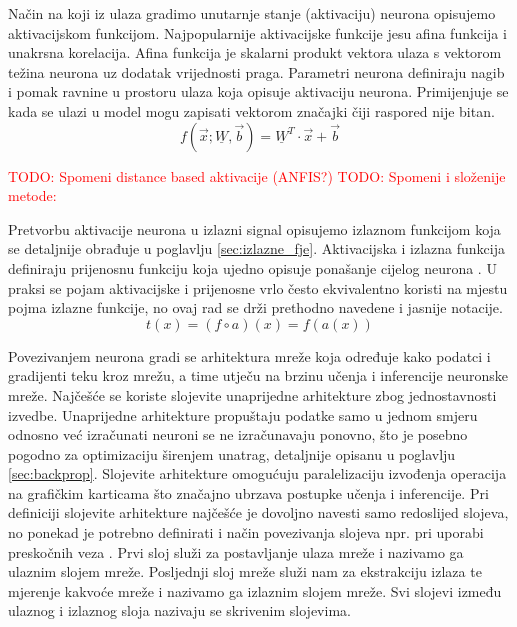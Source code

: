 \documentclass[times, utf8, diplomski]{fer}
\def\mat#1{\underline{#1}}
\def\TODO#1{\noindent\textcolor{red}{TODO: #1}\newline}
\begin{document}
Način na koji iz ulaza gradimo unutarnje stanje (aktivaciju) neurona opisujemo aktivacijskom funkcijom. Najpopularnije aktivacijske funkcije jesu afina funkcija i unakrsna korelacija.
Afina funkcija je skalarni produkt vektora ulaza s vektorom težina neurona uz dodatak vrijednosti praga. Parametri neurona definiraju nagib i pomak ravnine u prostoru ulaza koja opisuje aktivaciju neurona. Primijenjuje se kada se ulazi u model mogu zapisati vektorom značajki čiji raspored nije bitan.
\begin{equation}
f(\vec{x};\mat{W},\vec{b})=\mat{W}^T \cdot \vec{x} + \vec{b}
\end{equation}

\TODO{Spomeni distance based aktivacije (ANFIS?)}
\TODO{Spomeni i složenije metode: \citep{network_in_network}}

Pretvorbu aktivacije neurona u izlazni signal opisujemo izlaznom funkcijom koja se detaljnije obrađuje u poglavlju \ref{sec:izlazne_fje}. Aktivacijska i izlazna funkcija definiraju prijenosnu funkciju koja ujedno opisuje ponašanje cijelog neurona \citep{function_survey}. U praksi se pojam aktivacijske i prijenosne vrlo često ekvivalentno koristi na mjestu pojma izlazne funkcije, no ovaj rad se drži prethodno navedene i jasnije notacije.
\begin{equation}
t(x) = (f \circ a)(x) = f(a(x))
\end{equation}

Povezivanjem neurona gradi se arhitektura mreže koja određuje kako podatci i gradijenti teku kroz mrežu, a time utječu na brzinu učenja i inferencije neuronske mreže. Najčešće se koriste slojevite unaprijedne arhitekture zbog jednostavnosti izvedbe. Unaprijedne arhitekture propuštaju podatke samo u jednom smjeru odnosno već izračunati neuroni se ne izračunavaju ponovno, što je posebno pogodno za optimizaciju širenjem unatrag, detaljnije opisanu u poglavlju \ref{sec:backprop}. Slojevite arhitekture omogućuju paralelizaciju izvođenja operacija na grafičkim karticama što značajno ubrzava postupke učenja i inferencije. Pri definiciji slojevite arhitekture najčešće je dovoljno navesti samo redoslijed slojeva, no ponekad je potrebno definirati i način povezivanja slojeva npr. pri uporabi preskočnih veza \citep{highwaynet, resnet, densenet}. Prvi sloj služi za postavljanje ulaza mreže i nazivamo ga ulaznim slojem mreže. Posljednji sloj mreže služi nam za ekstrakciju izlaza te mjerenje kakvoće mreže i nazivamo ga izlaznim slojem mreže. Svi slojevi između ulaznog i izlaznog sloja nazivaju se skrivenim slojevima.
\end{document}
